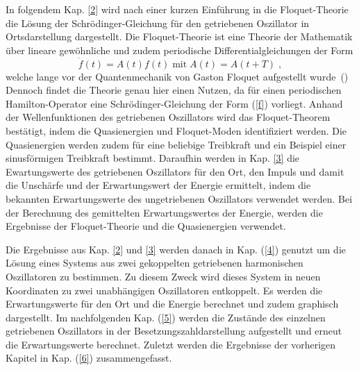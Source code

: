 In folgendem Kap. \ref{2} wird nach einer kurzen Einführung in die Floquet-Theorie die Lösung der Schrödinger-Gleichung für den getriebenen Oszillator in Ortsdarstellung dargestellt.
Die Floquet-Theorie ist eine Theorie der Mathematik über lineare gewöhnliche und zudem periodische Differentialgleichungen der Form
\begin{equation}
  \dot f(t)=A(t)f(t)\;\text{mit}\; A(t)=A(t+T) \; ,
  \label{f}
\end{equation}
welche lange vor der Quantenmechanik von Gaston Floquet aufgestellt wurde~(\cite{haengi})
Dennoch findet die Theorie genau hier einen Nutzen, da für einen periodischen Hamilton-Operator eine Schrödinger-Gleichung der Form (\ref{f}) vorliegt.
Anhand der Wellenfunktionen des getriebenen Oszillators wird das Floquet-Theorem bestätigt, indem die Quasienergien und Floquet-Moden identifiziert werden.
Die Quasienergien werden zudem für eine beliebige Treibkraft und ein Beispiel einer sinusförmigen Treibkraft bestimmt.
Daraufhin werden in Kap. \ref{3} die Ewartungswerte des getriebenen Oszillators für den Ort, den Impuls und damit die Unschärfe und der Erwartungswert der Energie ermittelt, indem die bekannten Erwartungswerte des ungetriebenen Oszillators verwendet werden.
Bei der Berechnung des gemittelten Erwartungswertes der Energie, werden die Ergebnisse der Floquet-Theorie und die Quasienergien verwendet.
\iffalse
Die Ergebnisse aus Kap. \ref{2} und \ref{3} werden danach in Kap. (\ref{4}) genutzt um die Lösung sowie die Erwartungswerte eines Systems aus zwei gekoppelten getriebenen harmonischen Oszillatoren zu bestimmen.
Die Erwartungswerte für den Ort und die Energie werden graphisch dargestellt und kommentiert.
Zu diesem Zweck wird dieses System in neuen Koordinaten zu zwei unabhängigen Oszillatoren entkoppelt.
\fi
Die Ergebnisse aus Kap. \ref{2} und \ref{3} werden danach in Kap. (\ref{4}) genutzt um die Lösung eines Systems aus zwei gekoppelten getriebenen harmonischen Oszillatoren zu bestimmen.
Zu diesem Zweck wird dieses System in neuen Koordinaten zu zwei unabhängigen Oszillatoren entkoppelt.
Es werden die Erwartungswerte für den Ort und die Energie berechnet und zudem graphisch dargestellt.
Im nachfolgenden Kap. (\ref{5}) werden die Zustände des einzelnen getriebenen Oszillators in der Besetzungszahldarstellung aufgestellt und erneut die Erwartungswerte berechnet.
Zuletzt werden die Ergebnisse der vorherigen Kapitel in Kap. (\ref{6}) zusammengefasst.
